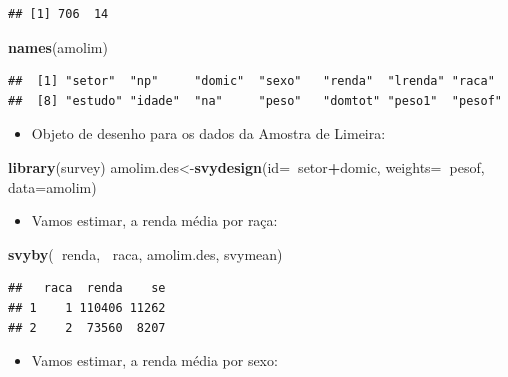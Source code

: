 \documentclass[]{book}
\newenvironment{Shaded}{\begin{snugshade}}{\end{snugshade}}
\newcommand{\KeywordTok}[1]{\textcolor[rgb]{0.13,0.29,0.53}{\textbf{#1}}}
\newcommand{\DataTypeTok}[1]{\textcolor[rgb]{0.13,0.29,0.53}{#1}}
\newcommand{\OperatorTok}[1]{\textcolor[rgb]{0.81,0.36,0.00}{\textbf{#1}}}
\newcommand{\NormalTok}[1]{#1}
\providecommand{\tightlist}{%
  \setlength{\itemsep}{0pt}\setlength{\parskip}{0pt}}
\theoremstyle{definition}
\theoremstyle{definition}
\theoremstyle{definition}
\theoremstyle{remark}
\begin{document}
\begin{verbatim}
## [1] 706  14
\end{verbatim}

\begin{Shaded}
\begin{Highlighting}[]
\KeywordTok{names}\NormalTok{(amolim)}
\end{Highlighting}
\end{Shaded}

\begin{verbatim}
##  [1] "setor"  "np"     "domic"  "sexo"   "renda"  "lrenda" "raca"  
##  [8] "estudo" "idade"  "na"     "peso"   "domtot" "peso1"  "pesof"
\end{verbatim}

\begin{itemize}
\tightlist
\item
  Objeto de desenho para os dados da Amostra de Limeira:
\end{itemize}

\begin{Shaded}
\begin{Highlighting}[]
\KeywordTok{library}\NormalTok{(survey)}
\NormalTok{amolim.des<-}\KeywordTok{svydesign}\NormalTok{(}\DataTypeTok{id=}\OperatorTok{~}\NormalTok{setor}\OperatorTok{+}\NormalTok{domic, }\DataTypeTok{weights=}\OperatorTok{~}\NormalTok{pesof,}
  \DataTypeTok{data=}\NormalTok{amolim)}
\end{Highlighting}
\end{Shaded}

\begin{itemize}
\tightlist
\item
  Vamos estimar, a renda média por raça:
\end{itemize}

\begin{Shaded}
\begin{Highlighting}[]
\KeywordTok{svyby}\NormalTok{(}\OperatorTok{~}\NormalTok{renda, }\OperatorTok{~}\NormalTok{raca, amolim.des, svymean)}
\end{Highlighting}
\end{Shaded}

\begin{verbatim}
##   raca  renda    se
## 1    1 110406 11262
## 2    2  73560  8207
\end{verbatim}

\begin{itemize}
\tightlist
\item
  Vamos estimar, a renda média por sexo:
\end{itemize}
\end{document}
